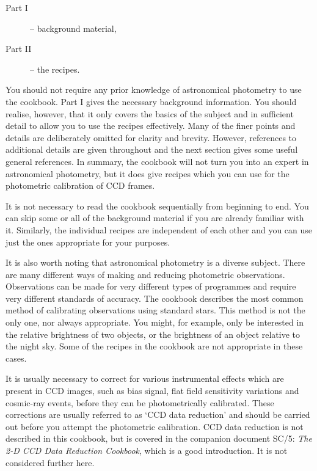 \documentclass[twoside,11pt]{article}
\newcommand{\xref}[3]{#1}
\begin{document}
\begin{description}

  \item[{\rm Part I}] -- background material,

  \item[{\rm Part II}] -- the recipes.

\end{description}

You should not require any prior knowledge of astronomical photometry
to use the cookbook.  Part I gives the necessary background information.
You should realise, however, that it only covers the basics of the
subject and in sufficient detail to allow you to use the recipes
effectively.  Many of the finer points and details are deliberately
omitted for clarity and brevity.  However, references to additional
details are given throughout and the next section gives some useful
general references.  In summary, the cookbook will not turn you into
an expert in astronomical photometry, but it does give recipes which
you can use for the photometric calibration of CCD frames.

It is not necessary to read the cookbook sequentially from beginning
to end.  You can skip some or all of the background material if you
are already familiar with it.  Similarly, the individual recipes are
independent of each other and you can use just the ones appropriate for
your purposes.

It is also worth noting that astronomical photometry is a diverse
subject.  There are many different ways of making and reducing
photometric observations.  Observations can be made for very different
types of programmes and require very different standards of accuracy.
The cookbook describes the most common method of calibrating observations
using standard stars.  This method is not the only one, nor always
appropriate.  You might, for example, only be interested in the
relative brightness of two objects, or the brightness of an object
relative to the night sky.  Some of the recipes in the cookbook are not
appropriate in these cases.

It is usually necessary to correct for various instrumental effects
which are present in CCD images, such as bias signal, flat field sensitivity
variations and cosmic-ray events, before they can be photometrically
calibrated.  These corrections are usually referred to as `CCD data
reduction' and should be carried out before you attempt the photometric
calibration.  CCD data reduction is not described in this cookbook, but is
covered in the companion document \xref{SC/5: {\it The 2-D CCD Data
Reduction Cookbook}}{sc5}{}\/\cite{SC5}, which is a good introduction.
It is not considered further here.
\end{document}
